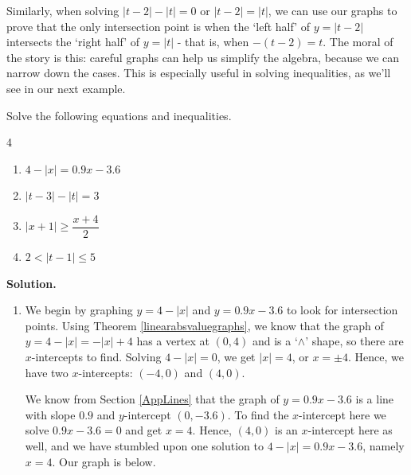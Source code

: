 \documentclass{ximera}
\begin{document}
\medskip

Similarly, when solving $|t-2| - |t| = 0$ or $|t-2| = |t|$, we can use our graphs to prove that the only intersection point is when the `left half' of $y = |t-2|$ intersects the `right half' of $y = |t|$ - that is, when $-(t-2) = t$.  The moral of the story is this:  careful graphs can help us simplify the algebra, because we can narrow down the cases.  This is especially useful in solving inequalities, as we'll see in our next example.

\begin{example} \label{abseqnineqex}  Solve the following equations and inequalities.  


\begin{multicols}{4}
\begin{enumerate}

\item $4-|x| = 0.9x  - 3.6$ 

\item  $|t-3|  - |t|= 3$ 

\item $|x+1|\geq \dfrac{x+4}{2}$

\item $2 < |t-1| \leq 5$ 


\end{enumerate}
\end{multicols}


{\bf Solution.}  
\begin{enumerate}

\item  We begin by graphing $y = 4 - |x|$ and $y = 0.9x - 3.6$ to look for intersection points. Using Theorem \ref{linearabsvaluegraphs}, we know that the graph of $y = 4-|x| = -|x|+4$ has a vertex at $(0,4)$ and is a `$\wedge$' shape, so there are $x$-intercepts to find.  Solving $4-|x| = 0$, we get $|x| = 4$, or  $x = \pm 4$.  Hence, we have two $x$-intercepts: $(-4,0)$ and $(4,0)$.    


We know from Section \ref{AppLines} that the graph of $y = 0.9x - 3.6$ is a line with slope $0.9$ and $y$-intercept $(0, -3.6)$. To find the $x$-intercept here we solve $0.9x - 3.6 = 0$ and get $x = 4$.  Hence, $(4,0)$ is an $x$-intercept here as well, and we have stumbled upon one solution to $4-|x| = 0.9x - 3.6$, namely $x = 4$.  Our graph is below.



\end{enumerate}
\end{example}
\end{document}
